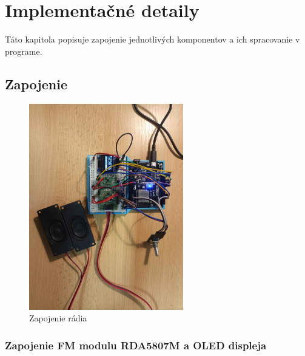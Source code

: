 \documentclass[11pt, a4paper]{article}
\begin{document}
\section{Implementačné detaily}
Táto kapitola popisuje zapojenie jednotlivých komponentov a ich spracovanie v programe.

\subsection{Zapojenie}
\begin{figure}[h!]
\centering
\includegraphics[width=0.6\textwidth, angle=90]{zapojenie.jpg}
\caption{Zapojenie rádia}
\end{figure}
\subsubsection{Zapojenie FM modulu RDA5807M a OLED displeja}
\end{document}
